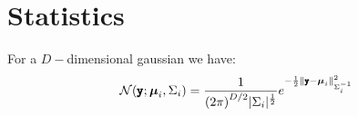 \documentclass[../../mathematics_cheat_sheet.tex]{subfiles}
\begin{document}
\chapter{Statistics}

For a $D-$dimensional gaussian we have:
\begin{equation}
  \mathcal{N}(\pmb{\mathtt{y}}; \boldsymbol{\mu}_{i},\Sigma_{i})=\frac{1}{{{(2\pi)}^{D/2}}{|\Sigma_{i}|^{\frac{1}{2}}}}e^{-\frac{1}{2}\left\lVert\pmb{\mathtt{y}}-\boldsymbol{\mu}_{i}\right\rVert^{2}_{\Sigma_{i}^{-1}}}
\end{equation}
\end{document}
